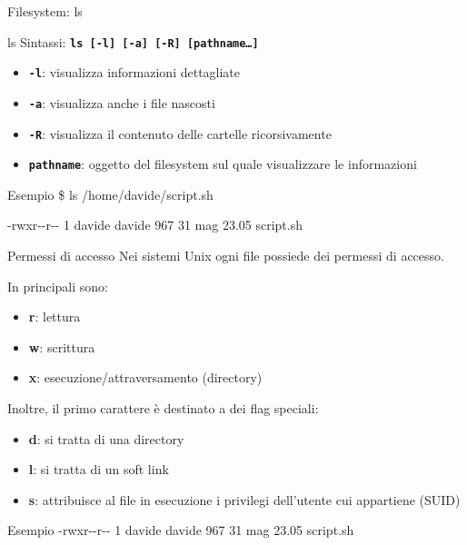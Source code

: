 \documentclass{beamer}
\begin{document}
    \begin{frame}{Filesystem: ls}
        \begin{block}{ls}
            Sintassi: \texttt{\textbf{ls [-l] [-a] [-R] [pathname\dots]}}

            \begin{itemize}
                \item \texttt{\textbf{-l}}: visualizza informazioni dettagliate
                \item \texttt{\textbf{-a}}: visualizza anche i file nascosti
                \item \texttt{\textbf{-R}}: visualizza il contenuto delle cartelle ricorsivamente
                \item \texttt{\textbf{pathname}}: oggetto del filesystem sul quale visualizzare le informazioni
            \end{itemize}
        \end{block}

        \begin{exampleblock}{Esempio}
            \$ ls /home/davide/script.sh
            
            -rwxr-{}-r-{}- 1 davide davide 967 31 mag 23.05 script.sh
        \end{exampleblock}
    \end{frame}

    \begin{frame}{Permessi di accesso}
        Nei sistemi Unix ogni file possiede dei permessi di accesso.

        In principali sono:
        \begin{itemize}
            \item \textbf{r}: lettura
            \item \textbf{w}: scrittura
            \item \textbf{x}: esecuzione/attraversamento (directory)
        \end{itemize}

        \vspace{0.5cm}

        Inoltre, il primo carattere è destinato a dei flag speciali:
        \begin{itemize}
            \item \textbf{d}: si tratta di una directory
            \item \textbf{l}: si tratta di un soft link
            \item \textbf{s}: attribuisce al file in esecuzione i privilegi dell'utente cui appartiene (SUID)
        \end{itemize}

        \begin{exampleblock}{Esempio}
            -rwxr-{}-r-{}- 1 davide davide 967 31 mag 23.05 script.sh
        \end{exampleblock}
    \end{frame}
\end{document}
